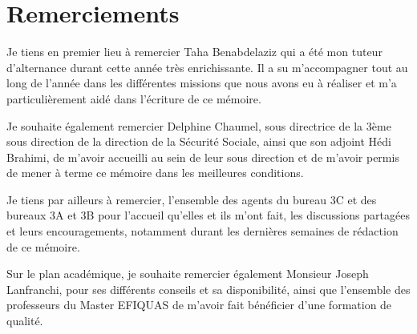 \chapter*{Remerciements}

Je tiens en premier lieu à remercier Taha Benabdelaziz qui a été mon tuteur d'alternance durant cette année très enrichissante. Il a su m'accompagner tout au long de l'année dans les différentes missions que nous avons eu à réaliser et m'a particulièrement aidé dans l'écriture de ce mémoire. 

\bigskip

Je souhaite également remercier Delphine Chaumel, sous directrice de la 3ème sous direction de la direction de la Sécurité Sociale, ainsi que son adjoint Hédi Brahimi, de m’avoir accueilli au sein de leur sous direction et de m’avoir permis de mener à terme ce mémoire dans les meilleures conditions.

\bigskip

Je tiens par ailleurs à remercier, l’ensemble des agents du bureau 3C et des bureaux 3A et 3B pour l'accueil qu'elles et ils m'ont fait, les discussions partagées et leurs encouragements, notamment durant les dernières semaines de rédaction de ce mémoire.

\bigskip

Sur le plan académique, je souhaite remercier également Monsieur Joseph Lanfranchi, pour ses différents conseils et sa disponibilité, ainsi que l’ensemble des professeurs du Master EFIQUAS de m’avoir fait bénéficier d’une formation de qualité.

\mbox{}
\newpage